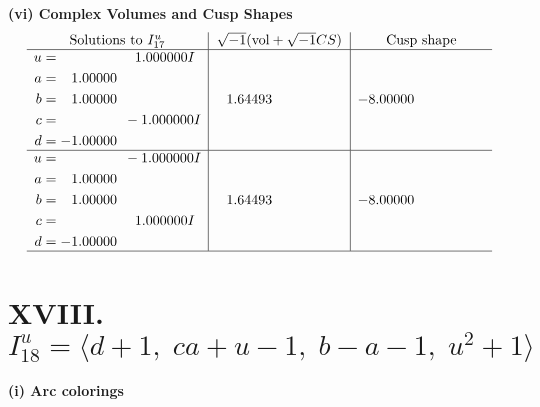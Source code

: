 \documentclass[1p]{elsarticle_modified}
\theoremstyle{definition}
\newcommand{\I}{\sqrt{-1}}
\begin{document}
\newpage\flushleft \textbf{(vi) Complex Volumes and Cusp Shapes}
$$\begin{array}{c|c|c}  
\text{Solutions to }I^u_{17}& \I (\text{vol} + \sqrt{-1}CS) & \text{Cusp shape}\\
 \hline 
\begin{aligned}
u &= \phantom{-0.000000 -}1.000000 I \\
a &= \phantom{-}1.00000\phantom{ +0.000000I} \\
b &= \phantom{-}1.00000\phantom{ +0.000000I} \\
c &= \phantom{-0.000000 } -1.000000 I \\
d &= -1.00000\phantom{ +0.000000I}\end{aligned}
 & \phantom{-}1.64493\phantom{ +0.000000I} & -8.00000\phantom{ +0.000000I} \\ \hline\begin{aligned}
u &= \phantom{-0.000000 } -1.000000 I \\
a &= \phantom{-}1.00000\phantom{ +0.000000I} \\
b &= \phantom{-}1.00000\phantom{ +0.000000I} \\
c &= \phantom{-0.000000 -}1.000000 I \\
d &= -1.00000\phantom{ +0.000000I}\end{aligned}
 & \phantom{-}1.64493\phantom{ +0.000000I} & -8.00000\phantom{ +0.000000I}\\
 \hline 
 \end{array}$$\newpage\newpage\renewcommand{\arraystretch}{1}
\centering \section*{XVIII. $I^u_{18}= \langle d+1,\;c a+u-1,\;b- a-1,\;u^2+1 \rangle$}
\flushleft \textbf{(i) Arc colorings}\\
\end{document}

